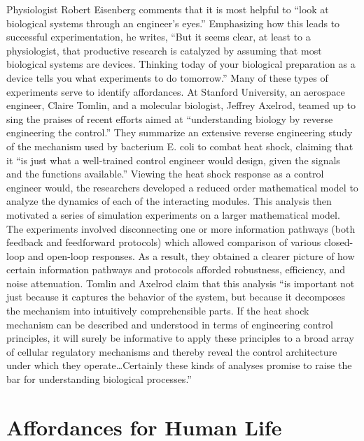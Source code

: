 Physiologist Robert Eisenberg comments that it is most helpful to “look
at biological systems through an engineer’s eyes.”\citep[][pg. 376]{eisenberg2007}
Emphasizing how this leads to successful experimentation, he writes,
“But it seems clear, at least to a physiologist, that productive
research is catalyzed by assuming that most biological systems are
devices. Thinking today of your biological preparation as a device
tells you what experiments to do tomorrow.” Many of these types of
experiments serve to identify affordances. At Stanford University, an
aerospace engineer, Claire Tomlin, and a molecular biologist, Jeffrey
Axelrod, teamed up to sing the praises of recent efforts aimed at
“understanding biology by reverse engineering the
control.”\citep[][pgs. 4219--4220]{tomlinaxelrod2005} They summarize an extensive reverse
engineering study of the mechanism used by bacterium E. coli to combat
heat shock,\citep{elsamadetal2005} claiming that it “is just what a
well-trained control engineer would design, given the signals and the
functions available.” Viewing the heat shock response as a control
engineer would, the researchers developed a reduced order mathematical
model to analyze the dynamics of each of the interacting modules. This
analysis then motivated a series of simulation experiments on a larger
mathematical model. The experiments involved disconnecting one or more
information pathways (both feedback and feedforward protocols) which
allowed comparison of various closed-loop and open-loop responses. As a
result, they obtained a clearer picture of how certain information
pathways and protocols afforded robustness, efficiency, and noise
attenuation. Tomlin and Axelrod claim that this analysis “is important
not just because it captures the behavior of the system, but because it
decomposes the mechanism into intuitively comprehensible parts. If the
heat shock mechanism can be described and understood in terms of
engineering control principles, it will surely be informative to apply
these principles to a broad array of cellular regulatory mechanisms and
thereby reveal the control architecture under which they
operate…Certainly these kinds of analyses promise to raise the bar for
understanding biological processes.”

\section{Affordances for Human Life}


